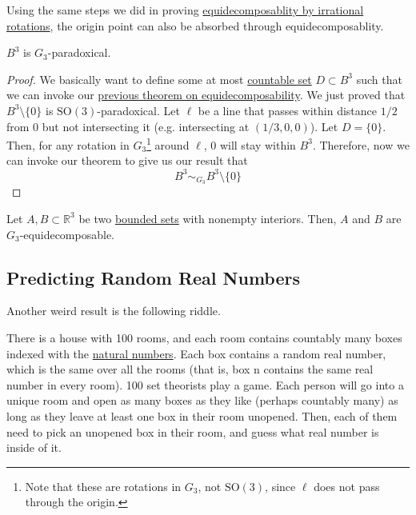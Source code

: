   Using the same steps we did in proving \hyperref[thm:equi-irrational]{equidecomposablity by irrational rotations}, the origin point can also be absorbed through equidecomposablity. 

  \begin{corollary}
    \label{thm:banach-tarski-paradox}
    $B^3$ is $G_3$-paradoxical. 
  \end{corollary}
  \begin{proof}
    We basically want to define some at most \hyperref[def:countable]{countable set} $D \subset B^3$ such that we can invoke our \hyperref[thm:equi-irrational]{previous theorem on equidecomposability}. We just proved that $B^3 \setminus \{0\}$ is $\mathrm{SO}(3)$-paradoxical. Let $\ell$ be a line that passes within distance $1/2$ from $0$ but not intersecting it (e.g. intersecting at $(1/3, 0, 0)$). Let $D = \{0\}$. Then, for any rotation in $G_3$\footnote{Note that these are rotations in $G_3$, not $\mathrm{SO}(3)$, since $\ell$ does not pass through the origin.} around $\ell$, $0$ will stay within $B^3$. Therefore, now we can invoke our theorem to give us our result that 
    \begin{equation}
      B^3 \sim_{G_3} B^3 \setminus \{0\} 
    \end{equation}
  \end{proof}

  \begin{theorem}
		\label{thm:strong_banach-tarski}
    Let $A, B \subset \mathbb{R}^3$ be two \hyperref[pst-def:bounded-set]{bounded sets} with nonempty interiors. Then, $A$ and $B$ are $G_3$-equidecomposable. 
  \end{theorem}

\subsection{Predicting Random Real Numbers} 

  Another weird result is the following riddle. 

  There is a house with 100 rooms, and each room contains countably many boxes indexed with the \hyperref[def:naturals]{natural numbers}. Each box contains a random real number, which is the same over all the rooms (that is, box n contains the same real number in every room). 100 set theorists play a game. Each person will go into a unique room and open as many boxes as they like (perhaps countably many) as long as they leave at least one box in their room unopened. Then, each of them need to pick an unopened box in their room, and guess what real number is inside of it.

